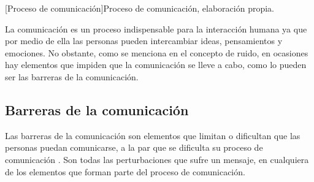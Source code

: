 

\begin{center}
    [Proceso de comunicación]{Proceso de comunicación, elaboración propia.}
\end{center}

La comunicación es un proceso indispensable para la interacción humana ya que por medio de ella las personas pueden intercambiar ideas, pensamientos y emociones. No obstante, como se menciona en el concepto de ruido, en ocasiones hay elementos que impiden que la comunicación se lleve a cabo, como lo pueden ser las barreras de la comunicación.

\newpage
\subsection{Barreras de la comunicación}
Las barreras de la comunicación son elementos que limitan o dificultan que las personas puedan comunicarse, a la par que se dificulta su proceso de comunicación \cite{ref2}. Son todas las perturbaciones que sufre un mensaje, en cualquiera de los elementos que forman parte del proceso de comunicación.\\


